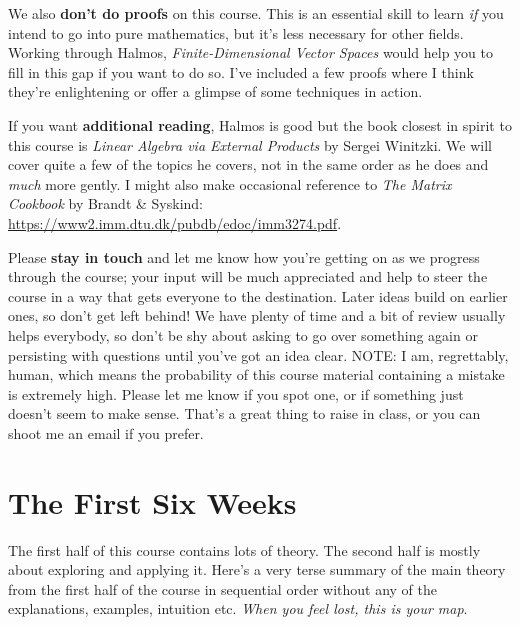 \documentclass[oneside,english]{amsbook}
\numberwithin{section}{chapter}
\theoremstyle{plain}
\theoremstyle{definition}
\begin{document}
We also \textbf{don't do proofs} on this course. This is an essential
skill to learn \emph{if} you intend to go into pure mathematics, but
it's less necessary for other fields. Working through Halmos,
\emph{Finite-Dimensional Vector Spaces} would help you to fill in this
gap if you want to do so. I've included a few proofs where I think
they're enlightening or offer a glimpse of some techniques in action.

If you want \textbf{additional reading}, Halmos is good but the book
closest in spirit to this course is \emph{Linear Algebra via External
	Products} by Sergei Winitzki. We will cover quite a few of the topics he
covers, not in the same order as he does and \emph{much} more gently. I
might also make occasional reference to \emph{The Matrix Cookbook} by
Brandt \& Syskind: \url{https://www2.imm.dtu.dk/pubdb/edoc/imm3274.pdf}.

Please \textbf{stay in touch} and let me know how you're getting on as
we progress through the course; your input will be much appreciated and
help to steer the course in a way that gets everyone to the destination.
Later ideas build on earlier ones, so don't get left behind! We have
plenty of time and a bit of review usually helps everybody, so don't be
shy about asking to go over something again or persisting with questions
until you've got an idea clear. NOTE: I am, regrettably, human, which
means the probability of this course material containing a mistake is
extremely high. Please let me know if you spot one, or if something just
doesn't seem to make sense. That's a great thing to raise in class, or
you can shoot me an email if you prefer.

\part{The First Six Weeks}

The first half of this course contains lots of theory. The second half
is mostly about exploring and applying it. Here's a very terse summary
of the main theory from the first half of the course in sequential order
without any of the explanations, examples, intuition etc. \emph{When you
	feel lost, this is your map}.
\end{document}
